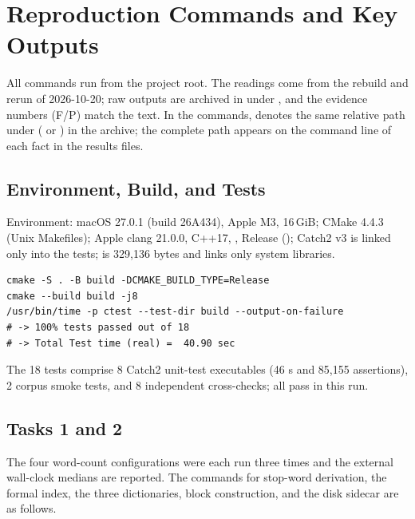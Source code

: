 
\section{Reproduction Commands and Key Outputs}
\label{app:reproduce}

All commands run from the project root. The readings come from the rebuild and
rerun of 2026-10-20; raw outputs are archived in  under
, and the evidence numbers (F/P) match the text. In
the commands,  denotes the same relative path under
 ( or ) in the archive; the
complete path appears on the command line of each fact in the results files.

\subsection{Environment, Build, and Tests}

Environment: macOS 27.0.1 (build 26A434), Apple M3, 16\,GiB; CMake 4.4.3
(Unix Makefiles); Apple clang 21.0.0, C++17, , Release
(); Catch2 v3 is linked only into the tests;
 is 329,136 bytes and links only system libraries.

\begin{lstlisting}[style=cli]
cmake -S . -B build -DCMAKE_BUILD_TYPE=Release
cmake --build build -j8
/usr/bin/time -p ctest --test-dir build --output-on-failure
# -> 100% tests passed out of 18
# -> Total Test time (real) =  40.90 sec
\end{lstlisting}

The 18 tests comprise 8 Catch2 unit-test executables (46 s and
85,155 assertions), 2 corpus smoke tests, and 8 independent cross-checks; all
pass in this run.

\subsection{Tasks 1 and 2}

The four word-count configurations were each run three times and the external
wall-clock medians are reported. The commands for stop-word derivation, the
formal index, the three dictionaries, block construction, and the disk sidecar
are as follows.

